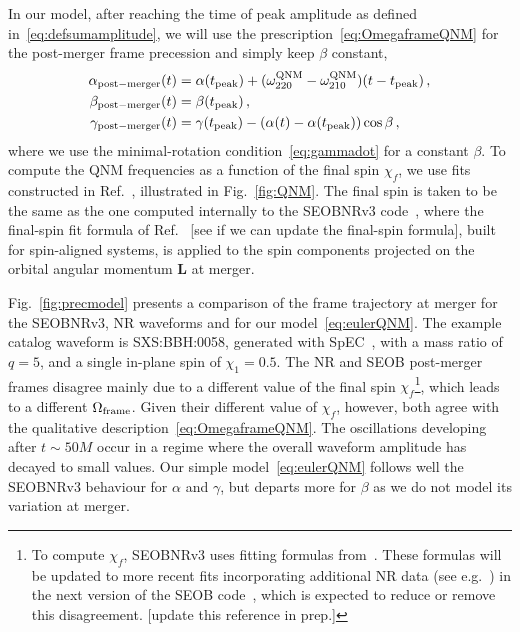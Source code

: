 \documentclass[aps,showpacs,twocolumn,
prd,superscriptaddress,nofootinbib]{revtex4-1}
\newcommand{\SM}[1]{{\color{Red} #1}}
\begin{document}
In our model, after reaching the time of peak amplitude as defined in~\eqref{eq:defsumamplitude}, we will use the prescription~\eqref{eq:OmegaframeQNM} for the post-merger frame precession and simply keep $\beta$ constant,
\begin{subequations}\label{eq:eulerQNM}
\begin{align}
	\alpha_{\rm post-merger}(t) &= \alpha(t_{\rm peak}) + (\omega_{220}^{\rm QNM} - \omega_{210}^{\rm QNM})(t-t_{\rm peak}) \,, \\
	\beta_{\rm post-merger}(t) &= \beta(t_{\rm peak}) \,, \\
	\gamma_{\rm post-merger}(t) &= \gamma(t_{\rm peak}) - (\alpha(t) - \alpha(t_{\rm peak}) )\cos \beta \,,
\end{align}
\end{subequations}
where we use the minimal-rotation condition~\eqref{eq:gammadot} for a constant $\beta$. To compute the QNM frequencies as a function of the final spin $\chi_{f}$, we use fits constructed in Ref.~\cite{Berti+05}, illustrated in Fig.~\ref{fig:QNM}. The final spin is taken to be the same as the one computed internally to the SEOBNRv3 code~\cite{Pan+13, BTB16}, where the final-spin fit formula of Ref.~\cite{BR09} \SM{[see if we can update the final-spin formula]}, built for spin-aligned systems, is applied to the spin components projected on the orbital angular momentum $\bm{L}$ at merger.

Fig.~\ref{fig:precmodel} presents a comparison of the frame trajectory at merger for the SEOBNRv3, NR waveforms and for our model~\eqref{eq:eulerQNM}. The example catalog waveform is SXS:BBH:0058, generated with SpEC~\cite{SXScatalog, SpEC, Mroue+12, Mroue+13}, with a mass ratio of $q=5$, and a single in-plane spin of $\chi_{1} = 0.5$. The NR and SEOB post-merger frames disagree mainly due to a different value of the final spin $\chi_{f}$\footnote{To compute $\chi_{f}$, SEOBNRv3 uses fitting formulas from~\cite{BR09}. These formulas will be updated to more recent fits incorporating additional NR data (see e.g.~\cite{HBR16}) in the next version of the SEOB code~\cite{Ossokine+18}, which is expected to reduce or remove this disagreement. \SM{[update this reference in prep.]}}, which leads to a different $\Omega_{\rm frame}$. Given their different value of $\chi_{f}$, however, both agree with the qualitative description~\eqref{eq:OmegaframeQNM}. The oscillations developing after $t\sim 50 M$ occur in a regime where the overall waveform amplitude has decayed to small values. Our simple model~\eqref{eq:eulerQNM} follows well the SEOBNRv3 behaviour for $\alpha$ and $\gamma$, but departs more for $\beta$ as we do not model its variation at merger.
\end{document}
